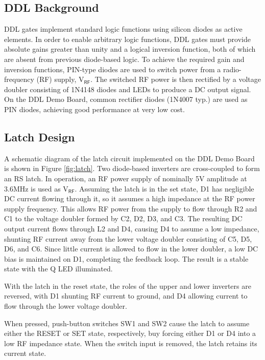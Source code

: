 \documentclass{article}
\newcommand{\ddl}{DDL }
\newcommand{\vrf}{V$_{\textsf{RF}}$}
\begin{document}
\begin{multicols}{2}
\section*{\ddl Background}
\noindent \ddl gates implement standard logic functions using silicon
diodes as active elements.  In order to enable arbitrary logic
functions, \ddl gates must provide absolute gains greater than unity
and a logical inversion function, both of which are absent from
previous diode-based logic. To achieve the required gain and inversion
functions, PIN-type diodes are used to switch power from a
radio-frequency (RF) supply, \vrf. The switched RF power is then
rectified by a voltage doubler consisting of 1N4148 diodes and LEDs to
produce a DC output signal. On the DDL Demo Board, common rectifier
diodes (1N4007 typ.)  are used as PIN diodes, achieving good
performance at very low cost.

\subsection*{Latch Design}
\noindent A schematic diagram of the latch circuit implemented on the
DDL Demo Board is shown in Figure \ref{fig:latch}.  Two diode-based
inverters are cross-coupled to form an RS latch.  In operation, an RF
power supply of nominally 5V amplitude at 3.6MHz is used as \vrf.
Assuming the latch is in the set state, D1 has negligible DC current
flowing through it, so it assumes a high impedance at the RF power
supply frequency. This allows RF power from the supply to flow through
R2 and C1 to the voltage doubler formed by C2, D2, D3, and C3.  The
resulting DC output current flows through L2 and D4, causing D4 to
assume a low impedance, shunting RF current away from the lower
voltage doubler consisting of C5, D5, D6, and C6.  Since little
current is allowed to flow in the lower doubler, a low DC bias is
maintained on D1, completing the feedback loop.  The result is a
stable state with the Q LED illuminated.

With the latch in the reset state, the roles of the upper and lower
inverters are reversed, with D1 shunting RF current to ground, and
D4 allowing current to flow through the lower voltage doubler.

When pressed, push-button switches SW1 and SW2 cause the latch to
assume either the RESET or SET state, respectively, buy forcing either
D1 or D4 into a low RF impedance state.  When the switch input is
removed, the latch retains its current state.


\end{multicols}
\end{document}
